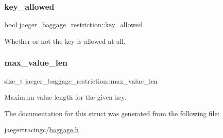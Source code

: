 \subsubsection{\texorpdfstring{key\+\_\+allowed}{key\_allowed}}
{\footnotesize\ttfamily bool jaeger\+\_\+baggage\+\_\+restriction\+::key\+\_\+allowed}



Whether or not the key is allowed at all. 

\mbox{\label{structjaeger__baggage__restriction_a740265dd2c887da97c9682ae6b5be73d}} 
\subsubsection{\texorpdfstring{max\+\_\+value\+\_\+len}{max\_value\_len}}
{\footnotesize\ttfamily size\+\_\+t jaeger\+\_\+baggage\+\_\+restriction\+::max\+\_\+value\+\_\+len}



Maximum value length for the given key. 



The documentation for this struct was generated from the following file\+:\begin{DoxyCompactItemize}
\item 
jaegertracingc/\mbox{\hyperlink{baggage_8h}{baggage.\+h}}\end{DoxyCompactItemize}
